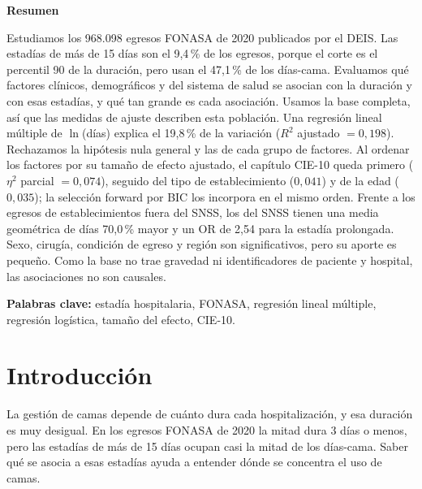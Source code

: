 \documentclass[10.5pt,a4paper,headings=small,abstract=false,bibliography=totoc,listof=totoc]{scrartcl}
\newcommand{\cie}{\mbox{CIE-10}}
\newcommand{\pct}{\,\%}
\begin{document}
{\sffamily\bfseries\color{acento}\Large Resumen}\par\vspace{0.6em}
Estudiamos los 968.098 egresos FONASA de 2020 publicados por el DEIS. Las estadías de más de 15 días son el 9,4\pct{} de los egresos, porque el corte es el percentil 90 de la duración, pero usan el 47,1\pct{} de los días-cama. Evaluamos qué factores clínicos, demográficos y del sistema de salud se asocian con la duración y con esas estadías, y qué tan grande es cada asociación. Usamos la base completa, así que las medidas de ajuste describen esta población. Una regresión lineal múltiple de $\ln$(días) explica el 19,8\pct{} de la variación ($R^2$ ajustado $=0{,}198$). Rechazamos la hipótesis nula general y las de cada grupo de factores. Al ordenar los factores por su tamaño de efecto ajustado, el capítulo \cie{} queda primero ($\eta^2$ parcial $=0{,}074$), seguido del tipo de establecimiento ($0{,}041$) y de la edad ($0{,}035$); la selección forward por BIC los incorpora en el mismo orden. Frente a los egresos de establecimientos fuera del SNSS, los del SNSS tienen una media geométrica de días 70,0\pct{} mayor y un OR de 2,54 para la estadía prolongada. Sexo, cirugía, condición de egreso y región son significativos, pero su aporte es pequeño. Como la base no trae gravedad ni identificadores de paciente y hospital, las asociaciones no son causales.

\vspace{0.4em}
{\small\color{gris}\textbf{Palabras clave:} estadía hospitalaria, FONASA, regresión lineal múltiple, regresión logística, tamaño del efecto, \cie.\par}

\clearpage
\tableofcontents
\vspace{1.2em}
\listoftables
\vspace{1.2em}
\listoffigures

\clearpage
{}

\section{Introducción}

La gestión de camas depende de cuánto dura cada hospitalización, y esa duración es muy desigual. En los egresos FONASA de 2020 la mitad dura 3 días o menos, pero las estadías de más de 15 días ocupan casi la mitad de los días-cama. Saber qué se asocia a esas estadías ayuda a entender dónde se concentra el uso de camas.
\end{document}
